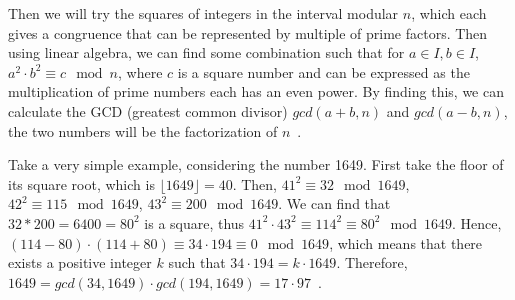 \documentclass[catalog.tex]{subfiles}
\begin{document}
Then we will try the squares of integers in the interval modular $n$, which each gives a congruence that can be represented by multiple of prime factors. Then using linear algebra, we can find some combination such that for $a\in I, b\in I$, $a^2\cdot b^2 \equiv c\mod n$, where $c$ is a square number and can be expressed as the multiplication of prime numbers each has an even power. By finding this, we can calculate the GCD (greatest common divisor) $gcd(a+b, n)$ and $gcd(a-b,n)$, the two numbers will be the factorization of $n$~\cite{QS}.

Take a very simple example, considering the number 1649. First take the floor of its square root, which is $\lfloor 1649 \rfloor = 40$. Then, $41^2 \equiv 32\mod 1649$, $42^2 \equiv 115\mod 1649$, $43^2 \equiv 200\mod 1649$. We can find that $32*200 = 6400 = 80^2$ is a square, thus $41^2\cdot 43^2 \equiv 114^2 \equiv 80^2\mod 1649$. Hence, $(114-80)\cdot (114+80) \equiv 34\cdot 194 \equiv 0\mod 1649$, which means that there exists a positive integer $k$ such that $34\cdot 194 = k\cdot 1649$. Therefore, $1649 = gcd(34, 1649)\cdot gcd(194, 1649) = 17\cdot 97$~\cite{joyOfFactoring}.
\begin{Algorithm}[Quadratic sieve\label{alg:\currfilebase_b}]
	\BlankLine
	

\end{Algorithm}
\singlespacing
\printbibliography[title={References.},resetnumbers=true,heading=subbibliography]
\end{document}
